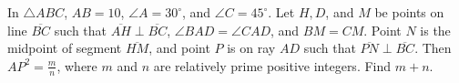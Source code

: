 In $\triangle ABC$, $AB=10$, $\angle A=30^\circ$, and $\angle C=45^\circ$. Let $H,D$, and $M$ be points on line $\overline{BC}$ such that $\overline{AH}\perp\overline{BC}$, $\angle BAD=\angle CAD$, and $BM=CM$. Point $N$ is the midpoint of segment $\overline{HM}$, and point $P$ is on ray $AD$ such that $\overline{PN}\perp\overline{BC}$. Then $AP^2=\tfrac{m}{n}$, where $m$ and $n$ are relatively prime positive integers. Find $m+n$.